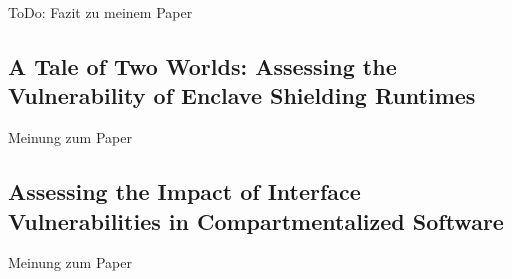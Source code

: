 ToDo: Fazit zu meinem Paper

\subsection{A Tale of Two Worlds: Assessing the Vulnerability of Enclave
Shielding Runtimes}

Meinung zum Paper

\subsection{Assessing the Impact of Interface Vulnerabilities in
Compartmentalized Software}

Meinung zum Paper